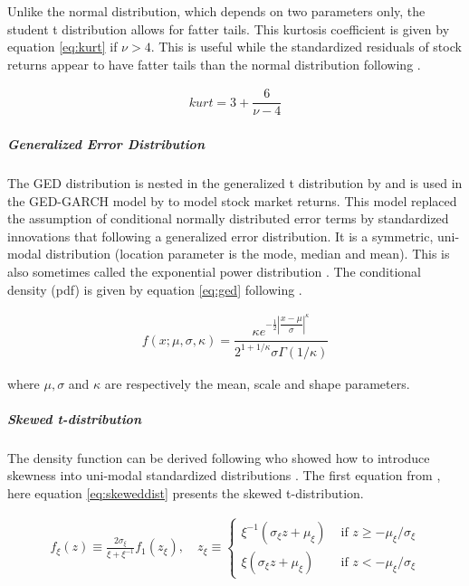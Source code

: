 \documentclass[a4paper, nobind]{templates/ociamthesis}
\begin{document}
\noindent Unlike the normal distribution, which depends on two parameters only, the student t distribution allows for fatter tails. This kurtosis coefficient is given by equation \eqref{eq:kurt} if \(\nu>4\). This is useful while the standardized residuals of stock returns appear to have fatter tails than the normal distribution following \textcite{bollerslev2008}.

\begin{align}
kurt = 3 + \dfrac{6}{\nu-4}
 \label{eq:kurt}
\end{align}

\hypertarget{generalized-error-distribution}{%
\subparagraph{Generalized Error Distribution}\label{generalized-error-distribution}}

\noindent The GED distribution is nested in the generalized t distribution by \textcite{mcdonald1988} and is used in the GED-GARCH model by \textcite{nelson1991} to model stock market returns. This model replaced the assumption of conditional normally distributed error terms by standardized innovations that following a generalized error distribution. It is a symmetric, uni-modal distribution (location parameter is the mode, median and mean). This is also sometimes called the exponential power distribution \autocite{bollerslev2008}. The conditional density (pdf) is given by equation \eqref{eq:ged} following \textcite{ghalanos2020}.

\begin{align}
f(x; \mu, \sigma, \kappa) = \dfrac{\kappa e^{-\frac{1}{2}\left|\dfrac{x-\mu}{\sigma}\right|^\kappa}}{2^{1+1/\kappa}\sigma\Gamma(1/\kappa)}
 \label{eq:ged}
\end{align}

where \(\mu, \sigma\) and \(\kappa\) are respectively the mean, scale and shape parameters.

\hypertarget{skewed-t-distribution}{%
\subparagraph{Skewed t-distribution}\label{skewed-t-distribution}}

\noindent The density function can be derived following \textcite{fernández1998} who showed how to introduce skewness into uni-modal standardized distributions \autocite{trottier2015}. The first equation from \textcite{trottier2015}, here equation \eqref{eq:skeweddist} presents the skewed t-distribution.

\begin{align}
f_{\xi}(z) \equiv \frac{2 \sigma_{\xi}}{\xi+\xi^{-1}} f_{1}\left(z_{\xi}\right), \quad z_{\xi} \equiv\left\{\begin{array}{ll}
\xi^{-1}\left(\sigma_{\xi} z+\mu_{\xi}\right) & \text { if } z \geq-\mu_{\xi} / \sigma_{\xi} \\
\xi\left(\sigma_{\xi} z+\mu_{\xi}\right) & \text { if } z<-\mu_{\xi} / \sigma_{\xi}
\end{array}\right.
 \label{eq:skeweddist}
\end{align}
\end{document}
